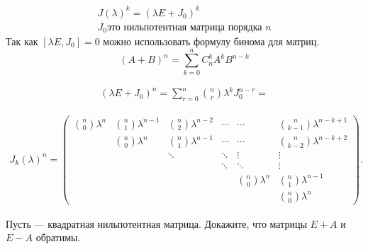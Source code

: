 \begin{sol}
    \begin{gather*}
        J(\lambda)^k = (\lambda E + J_0)^k \\
        J_{0} \mbox{это нильпотентная матрица порядка $n$}
    \end{gather*}
    Так как $\left[\lambda E, J_0\right] = 0$
    можно использовать формулу бинома для матриц.
    $$
    \left(A + B \right)^{n} = \sum_{k=0}^nC_n^kA^kB^{n-k} 
    $$
    
    \begin{gather*}
     \left(\lambda E + J_0 \right)^{n} = \sum_{r=0}^{n} {{n}\choose{r}}\lambda^k J_{0}^{n-r}   =
    \end{gather*}
    
    \begin{gather*}
        J_k(\lambda)^n = \begin{pmatrix}
        \binom{n}{0}\lambda^n & \binom{n}{1}\lambda^{n-1} & \binom{n}{2}\lambda^{n-2} & \cdots & \cdots & \binom{n}{k-1}\lambda^{n-k+1} \\
         & \binom{n}{0}\lambda^n & \binom{n}{1}\lambda^{n-1} & \cdots & \cdots & \binom{n}{k-2}\lambda^{n-k+2} \\
         &  & \ddots & \ddots & \vdots & \vdots\\
         &  & & \ddots & \ddots & \vdots\\
         &  & &  & \binom{n}{0}\lambda^n & \binom{n}{1}\lambda^{n-1}\\
         &  &  &  &  & \binom{n}{0}\lambda^n
        \end{pmatrix}.
    \end{gather*}
\end{sol}

\begin{prb}
Пусть — квадратная нильпотентная матрица. Докажите, что матрицы $E + A$
и $E - A$ обратимы.
\end{prb}

